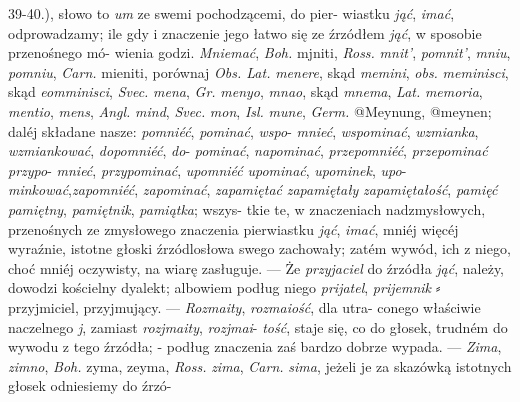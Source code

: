 39-40.), słowo to \textit{um} ze swemi pochodzącemi, do pier-
wiastku \textit{jąć}, \textit{imać}, odprowadzamy; ile gdy i znaczenie jego
łatwo się ze źrzódłem \textit{jąć}, w sposobie przenośnego mó-
wienia godzi. \textit{Mniemać}, \textit{Boh.} mjniti, \textit{Ross.} \textit{mnit'}, \textit{pomnit'},
\textit{mniu}, \textit{pomniu}, \textit{Carn.} mieniti, porównaj \textit{Obs. Lat.} \textit{menere},
skąd \textit{memini}, \textit{obs.} \textit{meminisci}, skąd \textit{eomminisci}, \textit{Svec.} \textit{mena},
\textit{Gr.} \textit{menyo}, \textit{mnao}, skąd \textit{mnema}, \textit{Lat.}  \textit{memoria}, \textit{mentio},
\textit{mens}, \textit{Angl.} \textit{mind}, \textit{Svec.} \textit{mon}, \textit{Isl.} \textit{mune}, \textit{Germ.} @{Meynung},
@{meynen}; daléj składane nasze: \textit{pomniéć}, \textit{pominać}, \textit{wspo}-
\textit{mnieć}, \textit{wspominać}, \textit{wzmianka}, \textit{wzmiankować}, \textit{dopomniéć}, \textit{do}-
\textit{pominać}, \textit{napominać}, \textit{przepomniéć}, \textit{przepominać} \textit{przypo}-
\textit{mnieć}, \textit{przypominać}, \textit{upomniéć} \textit{upominać}, \textit{upominek}, \textit{upo}-
\textit{minkować},\textit{zapomniéć}, \textit{zapominać}, \textit{zapamiętać} \textit{zapamiętały}
\textit{zapamiętałość}, \textit{pamięć} \textit{pamiętny}, \textit{pamiętnik}, \textit{pamiątka}; wszys-
tkie te, w znaczeniach nadzmysłowych, przenośnych ze
zmysłowego znaczenia pierwiastku \textit{jąć}, \textit{imać}, mniéj więcéj
wyraźnie, istotne głoski źrzódlosłowa swego  zachowały;
zatém wywód, ich z niego, choć mniéj oczywisty, na wiarę
zasługuje. ---  Że \textit{przyjaciel} do źrzódła \textit{jąć}, należy, dowodzi
kościelny dyalekt; albowiem podług niego \textit{prijatel}, \textit{prijemnik} ⸗
przyjmiciel, przyjmujący. --- \textit{Rozmaity}, \textit{rozmaiość}, dla utra-
conego właściwie naczelnego \textit{j}, zamiast \textit{rozjmaity}, \textit{rozjmai}-
\textit{tość}, staje się, co do głosek, trudném do wywodu z tego
źrzódła; - podług znaczenia zaś bardzo dobrze wypada. ---
\textit{Zima}, \textit{zimno}, \textit{Boh.} zyma, zeyma, \textit{Ross.} \textit{zima}, \textit{Carn.} \textit{sima},
jeżeli je za skazówką istotnych głosek odniesiemy do źrzó-


